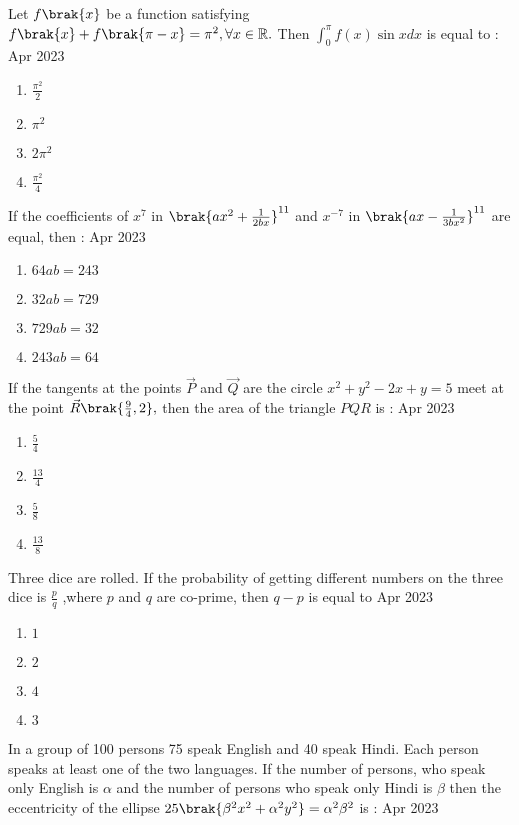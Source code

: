 \item Let $f\brak{x}$ be a function satisfying $f\brak{x}+f\brak{\pi -x}=\pi ^2,\forall x \in \mathbb{R}.$ Then $\int_0^{\pi} f(x) \sin x dx$ is equal to :   \hfill{Apr 2023}
        \begin{enumerate}
        \item $\frac{\pi ^2}{2}$
        \item $\pi ^2$
        \item $2\pi ^2$
        \item $\frac{\pi ^2}{4}$
    \end{enumerate}
\item If the coefficients of $x^7$ in $\brak{ ax^2 + \frac{1}{2bx}}^{11}$ and $x^{-7}$ in $\brak{ax - \frac{1}{3bx^2}}^{11}$ are equal, then :    \hfill{Apr 2023}
\begin{enumerate}
        \item $64 ab = 243$
        \item $32 ab = 729$
        \item $729 ab = 32$
        \item $243 ab = 64$
    \end{enumerate}
\item If the tangents at the points $\vec{P}$ and $\vec{Q}$ are the circle $ x^2 + y^2 -2x + y = 5 $ meet at the point $\vec{R} \brak{ \frac{9}{4},2} ,$ then the area of the triangle $PQR$ is : \hfill{Apr 2023}
\begin{enumerate}                  
        \item $\frac{5}{4}$    
        \item $\frac{13}{4}$
        \item $\frac{5}{8}$
        \item $\frac{13}{8}$
\end{enumerate}
\item Three dice are rolled. If the probability of getting different numbers on the three dice is
$\frac{p}{q}$ ,where $p$ and $q$ are co-prime, then $q-p$ is equal to \hfill{Apr 2023}
        \begin{enumerate}
        \item $1$ 
        \item $2$
        \item $4$ 
        \item $3$
    \end{enumerate}
\item In a group of 100 persons 75 speak English and 40 speak Hindi. Each person speaks at least one of the two languages. If the number of persons, who speak only English is $\alpha$ and the number of persons who speak only Hindi is $\beta $ then the eccentricity of the ellipse $25 \brak{\beta ^2 x^2 +\alpha ^2 y^2} = \alpha ^2 \beta ^2$ is : \hfill{Apr 2023}

